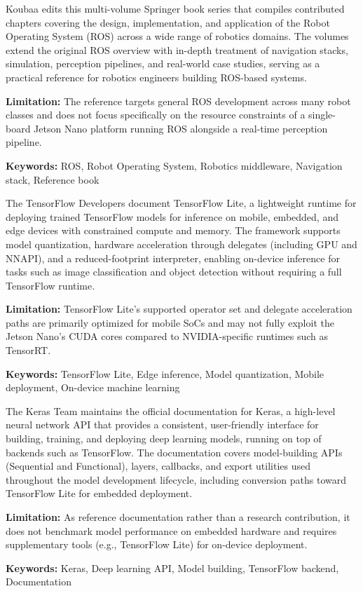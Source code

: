 {
	Koubaa \cite{Koubaa:2016} edits this multi-volume Springer book series that compiles contributed chapters covering the design, implementation, and application of the Robot Operating System (ROS) across a wide range of robotics domains. The volumes extend the original ROS overview with in-depth treatment of navigation stacks, simulation, perception pipelines, and real-world case studies, serving as a practical reference for robotics engineers building ROS-based systems.
	
	\bigskip
	\textbf{Limitation:} The reference targets general ROS development across many robot classes and does not focus specifically on the resource constraints of a single-board Jetson Nano platform running ROS alongside a real-time perception pipeline.
	
	\scriptsize{\textbf{Keywords:} ROS, Robot Operating System, Robotics middleware, Navigation stack, Reference book}
}

{
	The TensorFlow Developers \cite{Tensorflowlite:2024} document TensorFlow Lite, a lightweight runtime for deploying trained TensorFlow models for inference on mobile, embedded, and edge devices with constrained compute and memory. The framework supports model quantization, hardware acceleration through delegates (including GPU and NNAPI), and a reduced-footprint interpreter, enabling on-device inference for tasks such as image classification and object detection without requiring a full TensorFlow runtime.
	
	\bigskip
	\textbf{Limitation:} TensorFlow Lite's supported operator set and delegate acceleration paths are primarily optimized for mobile SoCs and may not fully exploit the Jetson Nano's CUDA cores compared to NVIDIA-specific runtimes such as TensorRT.
	
	\scriptsize{\textbf{Keywords:} TensorFlow Lite, Edge inference, Model quantization, Mobile deployment, On-device machine learning}
}

{
	The Keras Team \cite{Keras:2024} maintains the official documentation for Keras, a high-level neural network API that provides a consistent, user-friendly interface for building, training, and deploying deep learning models, running on top of backends such as TensorFlow. The documentation covers model-building APIs (Sequential and Functional), layers, callbacks, and export utilities used throughout the model development lifecycle, including conversion paths toward TensorFlow Lite for embedded deployment.
	
	\bigskip
	\textbf{Limitation:} As reference documentation rather than a research contribution, it does not benchmark model performance on embedded hardware and requires supplementary tools (e.g., TensorFlow Lite) for on-device deployment.
	
	\scriptsize{\textbf{Keywords:} Keras, Deep learning API, Model building, TensorFlow backend, Documentation}
}

